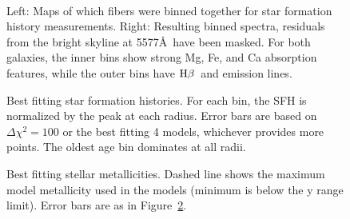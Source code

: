 \documentclass[12pt,preprint]{aastex}
\newcommand\hb{$\rm{H}\beta$}
\newcommand\HI{\ion{H}{1}}
\begin{document}
\begin{figure*}
 \\
\caption{Upper panels show kinematics from individual fibers, lower panels show the results after fibers have been binned into triples.
Left:  Stellar velocities measured with pPXF \citep{Cappellari04}. Middle:  Best fitting tilted ring model from kinemetry \citep{Krajn06}. Right: Best fit residuals.
\label{ugc_kinem_fibers}}
\end{figure*}


\begin{figure*}
\caption{Rotation curves extracted from the best fitting models in Figures~\ref{malin_kinem_fibers} and~\ref{ugc_kinem_fibers}.
The dashed curves show the expected stellar mass contribution to the rotation curve.
Vertical lines mark $R_e$ and $5R_e$.
Right panel includes \HI\ data from \citet{Pickering97}.
\label{gal_kinem}}
\end{figure*}


\begin{figure}
\caption{Left:  Maps of which fibers were binned together for star formation history measurements.
Right:  Resulting binned spectra, residuals from the bright skyline at 5577\AA\ have been masked.
For both galaxies, the inner bins show strong Mg, Fe, and Ca absorption features, while the outer bins have \hb\ and  emission lines. \label{gal_binmap}}
\end{figure}


\begin{figure}
\caption{ Best fitting star formation histories.
For each bin, the SFH is normalized by the peak at each radius.
Error bars are based on $\Delta\chi^2=100$ or the best fitting 4 models, whichever provides more points.
The oldest age bin dominates at all radii.
\label{sfh_gals} }
\end{figure}


\begin{figure}
\caption{Best fitting stellar metallicities.
 Dashed line shows the maximum model metallicity used in the models (minimum is below the y range limit).
Error bars are as in Figure~\ref{sfh_gals}.
\label{metal_gals}}
\end{figure}
\end{document}
